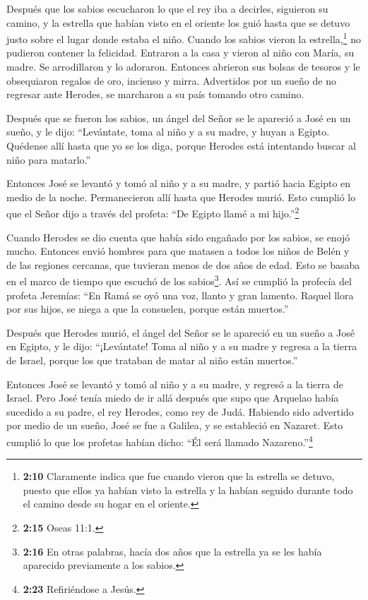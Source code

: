  Después que los sabios escucharon lo que el rey iba a
decirles, siguieron su camino, y la estrella que habían visto en el
oriente los guió hasta que se detuvo justo sobre el lugar donde estaba
el niño.  Cuando los sabios vieron la estrella,\footnote{\textbf{2:10}
  Claramente indica que fue cuando vieron que la estrella se detuvo,
  puesto que ellos ya habían visto la estrella y la habían seguido
  durante todo el camino desde su hogar en el oriente.} no pudieron
contener la felicidad.  Entraron a la casa y vieron al niño
con María, su madre. Se arrodillaron y lo adoraron. Entonces abrieron
sus bolsas de tesoros y le obsequiaron regalos de oro, incienso y mirra.
 Advertidos por un sueño de no regresar ante Herodes, se
marcharon a su país tomando otro camino.

 Después que se fueron los sabios, un ángel del Señor se le
apareció a José en un sueño, y le dijo: ``Levántate, toma al niño y a su
madre, y huyan a Egipto. Quédense allí hasta que yo se los diga, porque
Herodes está intentando buscar al niño para matarlo.''

 Entonces José se levantó y tomó al niño y a su madre, y
partió hacia Egipto en medio de la noche.  Permanecieron
allí hasta que Herodes murió. Esto cumplió lo que el Señor dijo a través
del profeta: ``De Egipto llamé a mi hijo.''\footnote{\textbf{2:15} Oseas
  11:1.}

 Cuando Herodes se dio cuenta que había sido engañado por
los sabios, se enojó mucho. Entonces envió hombres para que matasen a
todos los niños de Belén y de las regiones cercanas, que tuvieran menos
de dos años de edad. Esto se basaba en el marco de tiempo que escuchó de
los sabios\footnote{\textbf{2:16} En otras palabras, hacía dos años que
  la estrella ya se les había aparecido previamente a los sabios.}.
 Así se cumplió la profecía del profeta Jeremías:
 ``En Ramá se oyó una voz, llanto y gran lamento. Raquel
llora por sus hijos, se niega a que la consuelen, porque están
muertos.''

 Después que Herodes murió, el ángel del Señor se le
apareció en un sueño a José en Egipto, y le dijo: 
``¡Levántate! Toma al niño y a su madre y regresa a la tierra de Israel,
porque los que trataban de matar al niño están muertos.''

 Entonces José se levantó y tomó al niño y a su madre, y
regresó a la tierra de Israel.  Pero José tenía miedo de ir
allá después que supo que Arquelao había sucedido a su padre, el rey
Herodes, como rey de Judá. Habiendo sido advertido por medio de un
sueño, José se fue a Galilea,  y se estableció en Nazaret.
Esto cumplió lo que los profetas habían dicho: ``Él será llamado
Nazareno.''\footnote{\textbf{2:23} Refiriéndose a Jesús.}

